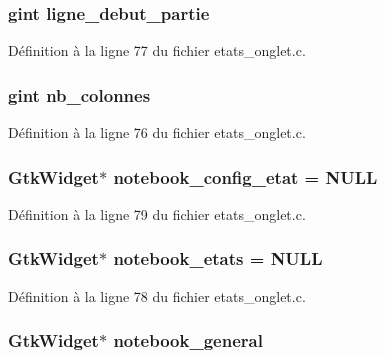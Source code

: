 \subsubsection[{ligne\_\-debut\_\-partie}]{\setlength{\rightskip}{0pt plus 5cm}gint {\bf ligne\_\-debut\_\-partie}}\label{etats__onglet_8c_afc1615a7c4b111e99e0facb32aa27364}


Définition à la ligne 77 du fichier etats\_\-onglet.c.

\subsubsection[{nb\_\-colonnes}]{\setlength{\rightskip}{0pt plus 5cm}gint {\bf nb\_\-colonnes}}\label{etats__onglet_8c_a8c9db61caf800767da87c8e115ed2b12}


Définition à la ligne 76 du fichier etats\_\-onglet.c.

\subsubsection[{notebook\_\-config\_\-etat}]{\setlength{\rightskip}{0pt plus 5cm}GtkWidget$\ast$ {\bf notebook\_\-config\_\-etat} = NULL}\label{etats__onglet_8c_ad5b48cab6caf68a0ecc6f6984325b022}


Définition à la ligne 79 du fichier etats\_\-onglet.c.

\subsubsection[{notebook\_\-etats}]{\setlength{\rightskip}{0pt plus 5cm}GtkWidget$\ast$ {\bf notebook\_\-etats} = NULL}\label{etats__onglet_8c_ae92ea175fa6b21c845c3a0971646f6d5}


Définition à la ligne 78 du fichier etats\_\-onglet.c.

\subsubsection[{notebook\_\-general}]{\setlength{\rightskip}{0pt plus 5cm}GtkWidget$\ast$ {\bf notebook\_\-general}}\label{etats__onglet_8c_a8924516aa4170f932308e93cf93a785b}


